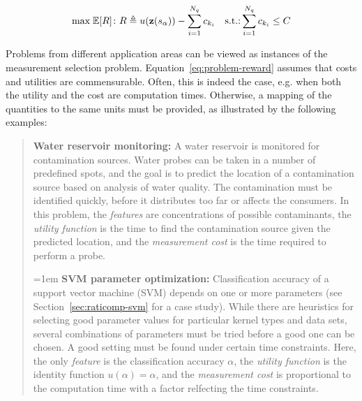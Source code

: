 \begin{equation}
\label{eq:problem-reward}
\mbox{max}\;\mathbb{E}[R]\colon R\triangleq u(\textbf{z}(s_\alpha))-\sum_{i=1}^{N_q}c_{k_i}\quad\mbox{s.t.:}\sum_{i=1}^{N_q}c_{k_i}\le C
\end{equation}

Problems from different application areas can be viewed as instances
of the measurement selection problem. Equation~\ref{eq:problem-reward} assumes
that costs and utilities are commensurable. Often, this is indeed the
case, e.g. when both the utility and the cost are computation
times. Otherwise, a mapping of the quantities to the same units must
be provided, as illustrated by the following examples:

\begin{quote}
{\bf Water reservoir monitoring:} A water reservoir is monitored for
contamination sources. Water probes can be taken in a number of
predefined spots, and the goal is to predict the location of a
contamination source based on analysis of water quality. The
contamination must be identified quickly, before it distributes too
far or affects the consumers. In this problem, the {\em features} are
concentrations of possible contaminants, the {\em utility function} is
the time to find the contamination source given the predicted
location, and the {\em measurement cost} is the time required to
perform a probe.

\hangindent=1em
{\bf SVM parameter optimization:} Classification accuracy of a support
vector machine (SVM) depends on one or more parameters (see
Section~\ref{sec:raticomp-svm} for a case study). While there are heuristics
for selecting good parameter values for particular kernel types and
data sets, several combinations of parameters must be tried before a
good one can be chosen. A good setting must be found under certain time
constraints. Here, the only {\em feature} is the classification
accuracy $\alpha$, the {\em utility function} is the identity function
$u(\alpha)=\alpha$, and the {\em measurement cost} is proportional to
the computation time with a factor relfecting the time constraints.
\end{quote}

